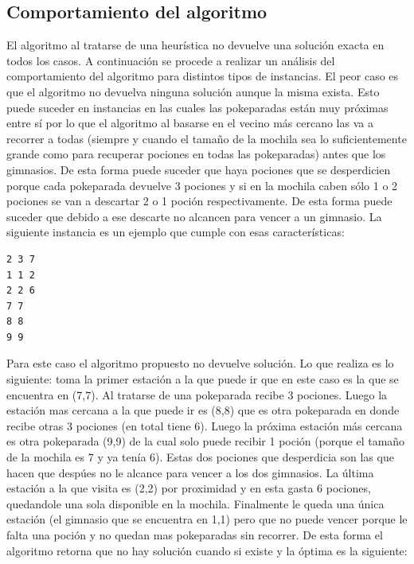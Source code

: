       \subsection{Comportamiento del algoritmo}
      El algoritmo al tratarse de una heurística no devuelve una solución exacta en todos los casos. A continuación se procede a realizar un análisis del comportamiento del algoritmo para distintos tipos de instancias. El peor caso es que el algoritmo no devuelva ninguna solución aunque la misma exista. Esto puede suceder en instancias en las cuales las pokeparadas están muy próximas entre sí por lo que el algoritmo al basarse en el vecino más cercano las va a recorrer a todas (siempre y cuando el tamaño de la mochila sea lo suficientemente grande como para recuperar pociones en todas las pokeparadas) antes que los gimnasios. De esta forma puede suceder que haya pociones que se desperdicien porque cada pokeparada devuelve 3 pociones y si en la mochila caben sólo 1 o 2 pociones se van a descartar 2 o 1 poción respectivamente. De esta forma puede suceder que debido a ese descarte no alcancen para vencer a un gimnasio. La siguiente instancia es un ejemplo que cumple con esas características: 

      \begin{codesnippet}
            \begin{verbatim}
2 3 7
1 1 2
2 2 6
7 7
8 8
9 9

\end{verbatim}
            \end{codesnippet}


      Para este caso el algoritmo propuesto no devuelve solución. Lo que realiza es lo siguiente: toma la primer estación a la que puede ir que en este caso es la que se encuentra en (7,7). Al tratarse de una pokeparada recibe 3 pociones. Luego la estación mas cercana a la que puede ir es (8,8) que es otra pokeparada en donde recibe otras 3 pociones (en total tiene 6). Luego la próxima estación más cercana es otra pokeparada (9,9) de la cual solo puede recibir 1 poción (porque el tamaño de la mochila es 7 y ya tenía 6). Estas dos pociones que desperdicia son las que hacen que despúes no le alcance para vencer a los dos gimnasios. La última estación a la que visita es (2,2) por proximidad y en esta gasta 6 pociones, quedandole una sola disponible en la mochila. Finalmente le queda una única estación (el gimnasio que se encuentra en 1,1) pero que no puede vencer porque le falta una poción y no quedan mas pokeparadas sin recorrer. De esta forma el algoritmo retorna que no hay solución cuando si existe y la óptima es la siguiente: 

